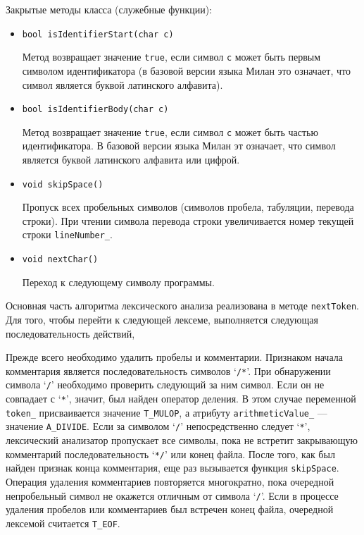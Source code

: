 \documentclass[a4paper,12pt]{article}
\begin{document}
Закрытые методы класса (служебные функции):
\begin{itemize}
\item \texttt{bool isIdentifierStart(char c)}

      Метод возвращает значение \texttt{true}, если символ \texttt{c} может быть
      первым символом идентификатора (в базовой версии языка Милан это означает,
      что символ является буквой латинского алфавита).

\item \texttt{bool isIdentifierBody(char c)}

      Метод возвращает значение \texttt{true}, если символ \texttt{c} может
      быть частью идентификатора. В базовой версии языка Милан эт означает, что
      символ является буквой латинского алфавита или цифрой.

\item \texttt{void skipSpace()}

      Пропуск всех пробельных символов (символов пробела, табуляции, перевода
      строки). При чтении символа перевода строки увеличивается номер текущей
      строки \texttt{lineNumber\_}.

\item \texttt{void nextChar()}

      Переход к следующему символу программы.
\end{itemize}

Основная часть алгоритма лексического анализа реализована в методе
\texttt{nextToken}. Для того, чтобы перейти к следующей лексеме, выполняется
следующая последовательность действий,

Прежде всего необходимо удалить пробелы и комментарии. Признаком начала
комментария является последовательность символов `\texttt{/*}'. При обнаружении
символа `\texttt{/}' необходимо проверить следующий за ним символ. Если он не
совпадает с `\texttt{*}', значит, был найден оператор деления. В этом случае
переменной \texttt{token\_} присваивается значение \texttt{T\_MULOP}, а атрибуту
\texttt{arithmeticValue\_} --- значение \texttt{A\_DIVIDE}. Если за символом
`\texttt{/}' непосредственно следует `\texttt{*}', лексический анализатор
пропускает все символы, пока не встретит закрывающую комментарий
последовательность `\texttt{*/}' или конец файла. После того, как был найден
признак конца комментария, еще раз вызывается функция \texttt{skipSpace}.
Операция удаления комментариев повторяется многократно, пока очередной
непробельный символ не окажется отличным от символа `\texttt{/}'. Если в
процессе удаления пробелов или комментариев был встречен конец файла, очередной
лексемой считается \texttt{T\_EOF}.
\end{document}

